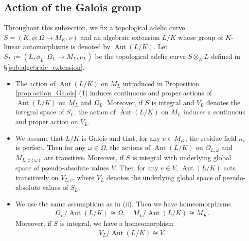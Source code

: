 \documentclass [11pt,reqno]{amsart}
\newcommand{\1}{\mathmybb{1}}
\def\Aut{\operatorname{Aut}}
\begin{document}
\subsection{Action of the Galois group}
\label{sub:action_of_Galois_group_tac}

Throughout this subsection, we fix a topological adelic curve $S=(K,\phi:\Omega\to M_K,\nu)$ and an algebraic extension $L/K$ whose group of $K$-linear automorphisms is denoted by $\Aut(L/K)$. Let $S_L := (L,\phi_{L} : \Omega_{L}\to M_{L},\nu_{L})$ be the topological adelic curve $S \otimes_K L$ defined in \S \ref{sub:algebraic_extension}.

\begin{proposition}
\label{prop:action_of_Galois_group_algebraic_extension}
\begin{itemize}
	\item[(i)]The action of $\Aut(L/K)$ on $M_L$ introduced in Proposition \ref{prop:action_Galois} (1) induces continuous and proper actions of $\Aut(L/K)$ on $M_L$ and $\Omega_L$. Moreover, if $S$ is integral and $V_L$ denotes the integral space of $S_L$, the action of $\Aut(L/K)$ on $M_L$ induces a continuous and proper action on $V_L$.
	\item[(ii)] We assume that $L/K$ is Galois and that, for any $v\in M_K$, the residue field $\kappa_{v}$ is perfect. Then for any $\omega\in\Omega$, the actions of $\Aut(L/K)$ on $\Omega_{L,\omega}$ and $M_{L,\phi(\omega)}$ are transitive. Moreover, if $S$ is integral with underlying global space of pseudo-absolute values $V$. Then for any $v\in V$, $\Aut(L/K)$ acts transitively on $V_{L,v}$, where $V_{L}$ denotes the underlying global space of pseudo-absolute values of $S_{L}$.
	\item[(iii)] We use the same assumptions as in (ii). Then we have homeomorphisms 
	\begin{align*}
	\Omega_L/\Aut(L/K) \cong \Omega, \quad M_{L}/\Aut(L/K) \cong M_K.
	\end{align*}
	 Moreover, if $S$ is integral, we have a homeomorphism 
	 \begin{align*}
	 V_L/\Aut(L/K) \cong V.
	 \end{align*}
\end{itemize}
\end{proposition}
\end{document}
